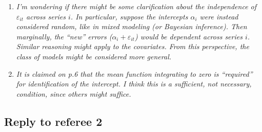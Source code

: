 \documentclass[a4paper,12pt]{article}
\begin{document}
\begin{enumerate}[label=\arabic*.,leftmargin=0.6cm]
\item \textit{I'm wondering if there might be some clarification about the independence of $\varepsilon_{it}$ across series $i$. In particular, suppose the intercepts $\alpha_i$ were instead considered random, like in mixed modeling (or Bayesian inference). Then marginally, the ``new'' errors ($\alpha_i + \varepsilon_{it}$) would be dependent across series $i$. Similar reasoning might apply to the covariates. From this perspective, the class of models might be considered more general.}

  
\item \textit{It is claimed on p.6 that the mean function integrating to zero is ``required'' for identification of the intercept. I think this is a sufficient, not necessary, condition, since others might suffice.} 

  
\end{enumerate}



\subsection*{Reply to referee 2}
\end{document}
